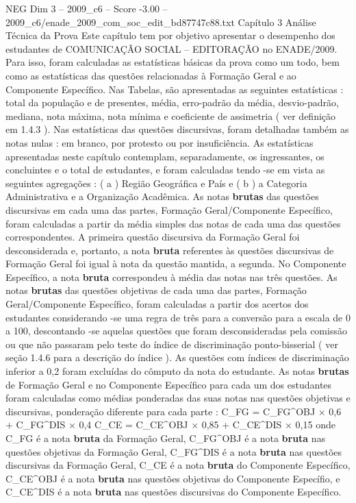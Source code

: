 \begin{textsample}{NEG Dim 3 – 2009\_c6 – Score -3.00 – 2009\_c6/enade\_2009\_com\_soc\_edit\_bd87747c88.txt}  \label{ex:f3_neg_049}
Capítulo 3 Análise Técnica da Prova Este capítulo tem por objetivo apresentar o desempenho dos estudantes de COMUNICAÇÃO SOCIAL – EDITORAÇÃO no ENADE/2009.
Para isso, foram calculadas as estatísticas básicas da prova como um todo, bem como as estatísticas das questões relacionadas à Formação Geral e ao Componente Específico.
Nas Tabelas, são apresentadas as seguintes estatísticas : total da população e de presentes, média, erro-padrão da média, desvio-padrão, mediana, nota máxima, nota mínima e coeficiente de assimetria ( ver definição em 1.4.3 ).
Nas estatísticas das questões discursivas, foram detalhadas também as notas nulas : em branco, por protesto ou por insuficiência.
As estatísticas apresentadas neste capítulo contemplam, separadamente, os ingressantes, os concluintes e o total de estudantes, e foram calculadas tendo -se em vista as seguintes agregações : ( a ) Região Geográfica e País e ( b ) a Categoria Administrativa e a Organização Acadêmica.
As notas \textbf{brutas} das questões discursivas em cada uma das partes, Formação Geral/Componente Específico, foram calculadas a partir da média simples das notas de cada uma das questões correspondentes.
A primeira questão discursiva da Formação Geral foi desconsiderada e, portanto, a nota \textbf{bruta} referentes às questões discursivas de Formação Geral foi igual à nota da questão mantida, a segunda.
No Componente Específico, a nota \textbf{bruta} correspondeu à média das notas nas três questões.
As notas \textbf{brutas} das questões objetivas de cada uma das partes, Formação Geral/Componente Específico, foram calculadas a partir dos acertos dos estudantes considerando -se uma regra de três para a conversão para a escala de 0 a 100, descontando -se aquelas questões que foram desconsideradas pela comissão ou que não passaram pelo teste do índice de discriminação ponto-bisserial ( ver seção 1.4.6 para a descrição do índice ).
As questões com índices de discriminação inferior a 0,2 foram excluídas do cômputo da nota do estudante.
As notas \textbf{brutas} de Formação Geral e no Componente Específico para cada um dos estudantes foram calculadas como médias ponderadas das suas notas nas questões objetivas e discursivas, ponderação diferente para cada parte : C\_FG = C\_FG\textasciicircum{}OBJ × 0,6 + C\_FG\textasciicircum{}DIS × 0,4 C\_CE = C\_CE\textasciicircum{}OBJ × 0,85 + C\_CE\textasciicircum{}DIS × 0,15 onde C\_FG é a nota \textbf{bruta} da Formação Geral, C\_FG\textasciicircum{}OBJ é a nota \textbf{bruta} nas questões objetivas da Formação Geral, C\_FG\textasciicircum{}DIS é a nota \textbf{bruta} nas questões discursivas da Formação Geral, C\_CE é a nota \textbf{bruta} do Componente Específico, C\_CE\textasciicircum{}OBJ é a nota \textbf{bruta} nas questões objetivas do Componente Específio, e C\_CE\textasciicircum{}DIS é a nota \textbf{bruta} nas questões discursivas do Componente Específico.

\end{textsample}
